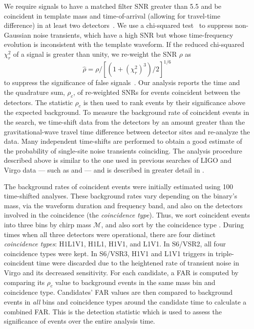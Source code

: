 \documentclass[prd,superscriptaddress,showpacs,amssymb,amsmath,amsfonts,aps,altaffilletter,nofootinbib,letterpaper,twocolumn]{revtex4}
\def\12to18{Abbott:2009qj}
\def\sfive1yr{Collaboration:2009tt}
\begin{document}
We require signals to have a matched filter \ac{SNR} greater than 5.5
and be coincident in template mass and time-of-arrival (allowing for
travel-time difference) in at least two detectors~\cite{Robinson:2008}.
We use a chi-squared test~\cite{Allen:2004} to suppress non-Gaussian
noise transients, which have a high \ac{SNR} but whose time-frequency
evolution is inconsistent with the template waveform. If the reduced
chi-squared $\chi^2_r$ of a signal is greater than unity, we re-weight
the \ac{SNR} $\rho$ as 
%
\begin{equation}\label{eq:new_snr}
\hat{\rho} = \rho/[(1+(\chi^2_r)^3)/2]^{1/6}
\end{equation}
%
to suppress the significance of false
signals~\cite{Collaboration:S6CBClowmass}. Our analysis reports the time
and the quadrature sum, $\rho_c$, of re-weighted SNRs for events
coincident between the detectors. The statistic $\rho_c$ is then used to
rank events by their significance above the expected background.  To
measure the background rate of coincident events in the search, we
time-shift data from the detectors by an amount greater than the
gravitational-wave travel time difference between detector sites and
re-analyze the data. Many independent time-shifts are performed to
obtain a good estimate of the probability of single-site noise
transients coinciding.  The analysis procedure described above is
similar to the one used in previous searches of \ac{LIGO} and Virgo data ---
such as \cite{\12to18} and \cite{\sfive1yr} --- and is described in greater
detail in \cite{pipeline}.

The background rates of coincident events were initially estimated using
100 time-shifted analyses. These background rates vary depending on the
binary's mass, via the waveform duration and frequency band, and also on
the detectors involved in the coincidence (the {\it coincidence type}).
Thus, we sort coincident events into three bins by chirp mass
$\mathcal{M}$, and also sort by the coincidence type
\cite{Collaboration:2009tt}.  During times when all three detectors were
operational, there are four distinct {\it coincidence types}: H1L1V1,
H1L1, H1V1, and L1V1. In S6/VSR2, all four coincidence types were kept.
In S6/VSR3, H1V1 and L1V1 triggers in triple-coincident time were
discarded due to the heightened rate of transient noise in Virgo and its
decreased sensitivity.  For each candidate, a \ac{FAR} is computed by
comparing its $\rho_c$ value to background events in the same mass bin
and coincidence type. Candidates' \ac{FAR} values are then compared to
background events in {\em all}\/ bins and coincidence types around the
candidate time to calculate a combined \ac{FAR}. This is the detection
statistic which is used to assess the significance of events over the
entire analysis time.
\end{document}
